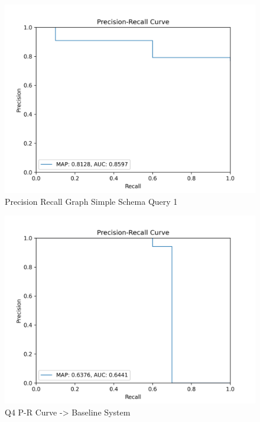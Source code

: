 \documentclass[sigconf]{acmart}
\begin{document}
  \begin{figure}[H]
  \centering
  \includegraphics[width=\linewidth]{precision_recal_simple_1.png}
  \caption{Precision Recall Graph Simple Schema Query 1}
  \label{fig:precisionRecalSimple1}
  \end{figure}
  
\begin{figure}[H]
  	\centering
  	\includegraphics[width=\linewidth]{precision_recal_simple_4.png}
  	\caption{Q4 P-R Curve -> Baseline System}
  	\label{fig:precisionRecalSimple4}
  \end{figure}
\end{document}
